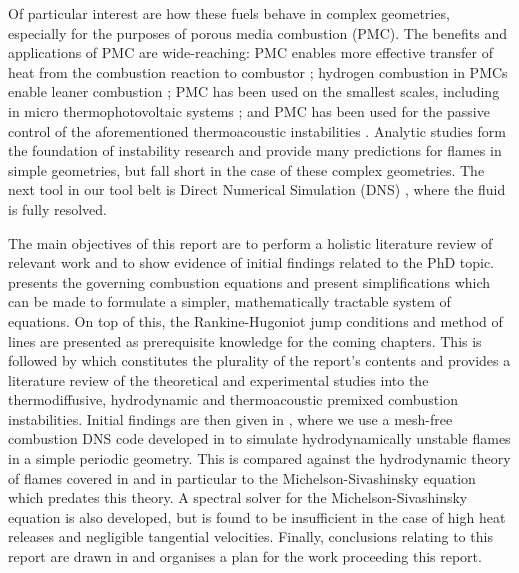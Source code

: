 Of particular interest are how these fuels behave in complex geometries, especially for the purposes of porous media combustion (PMC). The benefits and applications of PMC are wide-reaching: PMC enables more effective transfer of heat from the combustion reaction to combustor \cite{mujeebu2009CombustionPorousMedia}; hydrogen combustion in PMCs enable leaner combustion \cite{tseng2002EffectsHydrogenAddition}; PMC has been used on the smallest scales, including in micro thermophotovoltaic systems \cite{pan2015HydrogenOxygenPremixed}; and PMC has been used for the passive control of the aforementioned thermoacoustic instabilities \cite{meadows2015PorousInsertsPassive, dowd2018ThermoacousticInstabilityModel}. Analytic studies form the foundation of instability research and provide many predictions for flames in simple geometries, but fall short in the case of these complex geometries. The next tool in our tool belt is Direct Numerical Simulation (DNS) \cite{orszag1970AnalyticalTheoriesTurbulence}, where the fluid is fully resolved.

The main objectives of this report are to perform a holistic literature review of relevant work and to show evidence of initial findings related to the PhD topic.  presents the governing combustion equations and present simplifications which can be made to formulate a simpler, mathematically tractable system of equations. On top of this, the Rankine-Hugoniot jump conditions and method of lines are presented as prerequisite knowledge for the coming chapters. This is followed by  which constitutes the plurality of the report's contents and provides a literature review of the theoretical and experimental studies into the thermodiffusive, hydrodynamic and thermoacoustic premixed combustion instabilities. Initial findings are then given in , where we use a mesh-free combustion DNS code developed in \cite{king2022HighOrderSimulationsIsothermal, king2024MeshFreeFrameworkHighOrdera, king2020HighOrderDifference, kingSunsetFlames} to simulate hydrodynamically unstable flames in a simple periodic geometry. This is compared against the hydrodynamic theory of flames covered in  and in particular to the Michelson-Sivashinsky equation which predates this theory. A spectral solver for the Michelson-Sivashinsky equation is also developed, but is found to be insufficient in the case of high heat releases and negligible tangential velocities. Finally, conclusions relating to this report are drawn in  and  organises a plan for the work proceeding this report.




